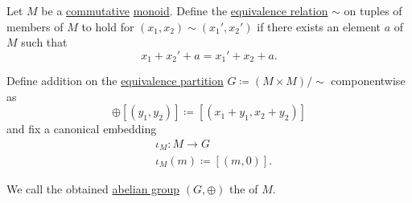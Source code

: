 \begin{definition}\label{def:monoid_grothendieck_completion}
  Let \( M \) be a \hyperref[def:magma/commutative]{commutative} \hyperref[def:monoid]{monoid}. Define the \hyperref[def:equivalence_relation]{equivalence relation} \( \sim \) on tuples of members of \( M \) to hold for \( (x_1, x_2) \sim (x_1', x_2') \) if there exists an element \( a \) of \( M \) such that
  \begin{equation*}
    x_1 + x_2' + a = x_1' + x_2 + a.
  \end{equation*}

  Define addition on the \hyperref[thm:equivalence_partition]{equivalence partition} \( G \coloneqq (M \times M) / \sim \) componentwise as
  \begin{equation*}
    [(x_1, x_2)] \oplus [(y_1, y_2)] \coloneqq [(x_1 + y_1, x_2 + y_2)]
  \end{equation*}
  and fix a canonical embedding
  \begin{equation*}
    \begin{aligned}
      &\iota_M: M \to G \\
      &\iota_M(m) \coloneqq [(m, 0)].
    \end{aligned}
  \end{equation*}

  We call the obtained \hyperref[def:abelian_group]{abelian group} \( (G, \oplus) \) the  of \( M \).
\end{definition}
